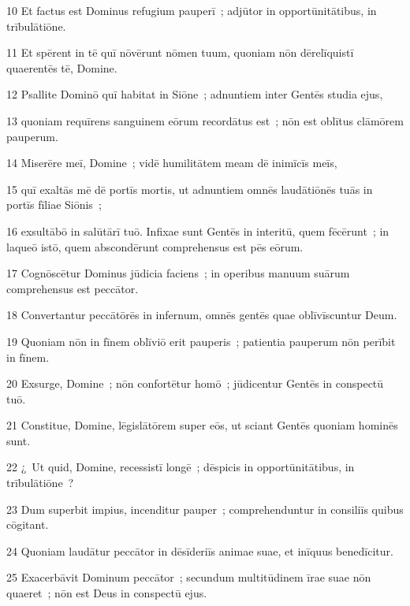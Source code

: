 \psalmVerse
  {\phantom{0}10}
  {Et factus est Dominus refugium pauperī~; adjūtor in opportūnitātibus, in trībulātiōne.}


\psalmVerse
  {\phantom{0}11}
  {Et spērent in tē quī nōvērunt nōmen tuum, quoniam nōn dērelīquistī quaerentēs tē, Domine.}


\psalmVerse
  {\phantom{0}12}
  {Psallite Dominō quī habitat in Siōne~; adnuntiem inter Gentēs studia ejus,}


\psalmVerse
  {\phantom{0}13}
  {quoniam requīrens sanguinem eōrum recordātus est~; nōn est oblītus clāmōrem pauperum.}


\psalmVerse
  {\phantom{0}14}
  {Miserēre meī, Domine~; vidē humilitātem meam dē inimīcīs meīs,}


\psalmVerse
  {\phantom{0}15}
  {quī exaltās mē dē portīs mortis, ut adnuntiem omnēs laudātiōnēs tuās in portīs fīliae Siōnis~;}


\psalmVerse
  {\phantom{0}16}
  {exsultābō in salūtārī tuō. Infixae sunt Gentēs in interitū, quem fēcērunt~; in laqueō istō, quem abscondērunt comprehensus est pēs eōrum.}


\psalmVerse
  {\phantom{0}17}
  {Cognōscētur Dominus jūdicia faciens~; in operibus manuum suārum comprehensus est peccātor.}


\psalmVerse
  {\phantom{0}18}
  {Convertantur peccātōrēs in infernum, omnēs gentēs quae oblīvīscuntur Deum.}


\psalmVerse
  {\phantom{0}19}
  {Quoniam nōn in fīnem oblīviō erit pauperis~; patientia pauperum nōn perībit in fīnem.}


\psalmVerse
  {\phantom{0}20}
  {Exsurge, Domine~; nōn confortētur homō~; jūdicentur Gentēs in conspectū tuō.}


\psalmVerse
  {\phantom{0}21}
  {Constitue, Domine, lēgislātōrem super eōs, ut sciant Gentēs quoniam hominēs sunt.}


\psalmVerse
  {\phantom{0}22}
  {¿~Ut quid, Domine, recessistī longē~; dēspicis in opportūnitātibus, in trībulātiōne~?}


\psalmVerse
  {\phantom{0}23}
  {Dum superbit impius, incenditur pauper~; comprehenduntur in consiliīs quibus cōgitant.}


\psalmVerse
  {\phantom{0}24}
  {Quoniam laudātur peccātor in dēsīderiīs animae suae, et inīquus benedīcitur.}


\psalmVerse
  {\phantom{0}25}
  {Exacerbāvit Dominum peccātor~; secundum multitūdinem īrae suae nōn quaeret~; nōn est Deus in conspectū ejus.}


